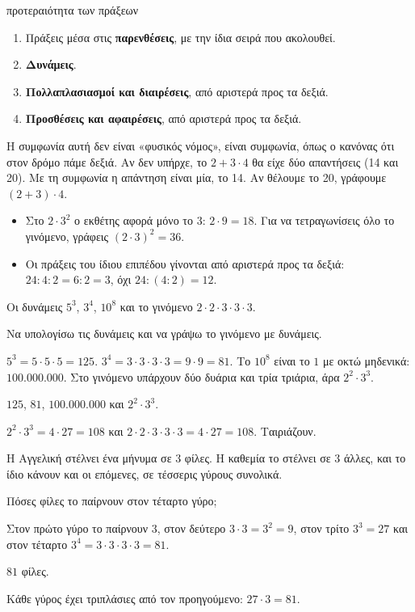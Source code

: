 \begin{kanonas}{προτεραιότητα των πράξεων}
\begin{enumerate}[leftmargin=1.6em,itemsep=0.2ex,topsep=2pt]
\item Πράξεις μέσα στις \textbf{παρενθέσεις}, με την ίδια σειρά που ακολουθεί.
\item \textbf{Δυνάμεις}.
\item \textbf{Πολλαπλασιασμοί και διαιρέσεις}, από αριστερά προς τα δεξιά.
\item \textbf{Προσθέσεις και αφαιρέσεις}, από αριστερά προς τα δεξιά.
\end{enumerate}
\end{kanonas}

Η συμφωνία αυτή δεν είναι «φυσικός νόμος», είναι συμφωνία, όπως ο κανόνας ότι στον δρόμο πάμε δεξιά. Αν δεν υπήρχε, το $2+3\cdot 4$ θα είχε δύο απαντήσεις (14 και 20). Με τη συμφωνία η απάντηση είναι μία, το 14. Αν θέλουμε το 20, γράφουμε $(2+3)\cdot 4$.

\begin{prosoxi}
\begin{itemize}[leftmargin=1.2em,itemsep=0.3ex,topsep=2pt]
\item Στο $2\cdot 3^2$ ο εκθέτης αφορά μόνο το $3$: $2\cdot 9=18$. Για να τετραγωνίσεις όλο το γινόμενο, γράφεις $(2\cdot 3)^2=36$.
\item Οι πράξεις του ίδιου επιπέδου γίνονται από αριστερά προς τα δεξιά: $24:4:2=6:2=3$, όχι $24:(4:2)=12$.
\end{itemize}
\end{prosoxi}


\tixero Οι δυνάμεις $5^3$, $3^4$, $10^8$ και το γινόμενο $2\cdot 2\cdot 3\cdot 3\cdot 3$.\par
\tithelo Να υπολογίσω τις δυνάμεις και να γράψω το γινόμενο με δυνάμεις.\par
\possindeo $5^3=5\cdot 5\cdot 5=125$. $3^4=3\cdot 3\cdot 3\cdot 3=9\cdot 9=81$. Το $10^8$ είναι το $1$ με οκτώ μηδενικά: $100.000.000$. Στο γινόμενο υπάρχουν δύο δυάρια και τρία τριάρια, άρα $2^2\cdot 3^3$.\par
\apantisi $125$, $81$, $100.000.000$ και $2^2\cdot 3^3$.\par
\elegxos $2^2\cdot 3^3=4\cdot 27=108$ και $2\cdot 2\cdot 3\cdot 3\cdot 3=4\cdot 27=108$. Ταιριάζουν.

\tixero Η Αγγελική στέλνει ένα μήνυμα σε $3$ φίλες. Η καθεμία το στέλνει σε $3$ άλλες, και το ίδιο κάνουν και οι επόμενες, σε τέσσερις γύρους συνολικά.\par
\tithelo Πόσες φίλες το παίρνουν στον τέταρτο γύρο;\par
\possindeo Στον πρώτο γύρο το παίρνουν $3$, στον δεύτερο $3\cdot 3=3^2=9$, στον τρίτο $3^3=27$ και στον τέταρτο $3^4=3\cdot 3\cdot 3\cdot 3=81$.\par
\apantisi $81$ φίλες.\par
\elegxos Κάθε γύρος έχει τριπλάσιες από τον προηγούμενο: $27\cdot 3=81$.

